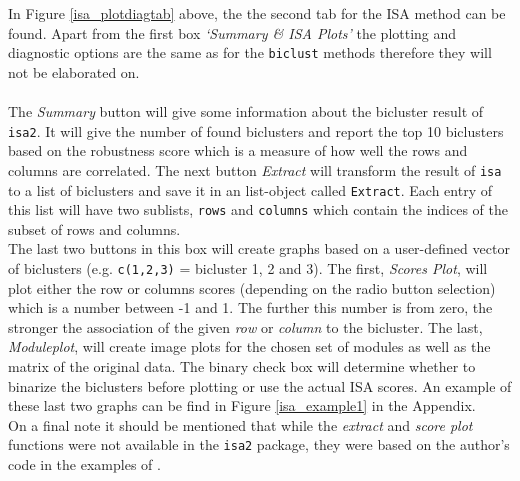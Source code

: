 \documentclass[a4paper]{article}\usepackage[]{graphicx}\usepackage[]{color}
\begin{document}
\noindent In Figure \ref{isa_plotdiagtab} above, the the second tab for the ISA
method can be found. Apart from the first box {\it `Summary \& ISA Plots'} the plotting and
diagnostic options are the same as for the \verb|biclust| methods therefore they
will not be elaborated on.\\ \\
The {\it Summary} button will give some information about the bicluster result
of \verb|isa2|. It will give the number of found biclusters and report the top
10 biclusters based on the robustness score which is a measure of how well the
rows and columns are correlated. The next button {\it Extract} will transform the
result of \verb|isa| to a list of biclusters and save it in an list-object
called \verb|Extract|. Each entry of this list will have two sublists,
\verb|rows| and \verb|columns| which contain the indices of the subset of rows and
columns.\\
The last two buttons in this box will create graphs based on a user-defined
vector of biclusters (e.g. \verb|c(1,2,3)| = bicluster 1, 2 and 3). The first,
{\it Scores Plot}, will plot either the row or columns scores (depending on the
radio button selection) which is a number between -1 and 1. The further this
number is from zero, the stronger the association of the given {\it row} or
{\it column} to the bicluster. The last, {\it Moduleplot}, will create image
plots for the chosen set of modules as well as the matrix of the original data. The binary
check box will determine whether to binarize the biclusters before plotting or
use the actual ISA scores. An example of these last two graphs can be find in
Figure \ref{isa_example1} in the Appendix.\\
On a final note it should be mentioned that while the {\it extract} and {\it
score plot} functions were not available in the \verb|isa2| package, they were
based on the author's code in the examples of \citet{Csardi2013}.



\end{document}
